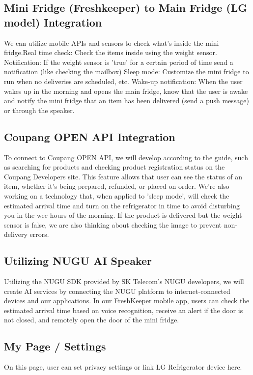\documentclass[conference]{IEEEtran}
\begin{document}
\subsection{Mini Fridge (Freshkeeper) to Main Fridge (LG model) Integration}
We can utilize mobile APIs and sensors to check what's inside the mini fridge.Real time check: Check the items inside using the weight sensor.
Notification: If the weight sensor is 'true' for a certain period of time send a notification (like checking the mailbox)
Sleep mode: Customize the mini fridge to run when no deliveries are scheduled, etc.
Wake-up notification: When the user wakes up in the morning and opens the main fridge, know that the user is awake and notify the mini fridge that an item has been delivered (send a push message) or through the speaker.

\subsection{Coupang OPEN API Integration}
To connect to Coupang OPEN API, we will develop according to the guide, such as searching for products and checking product registration status on the Coupang Developers site. This feature allows that user can see the status of an item, whether it's being prepared, refunded, or placed on order. We're also working on a technology that, when applied to 'sleep mode', will check the estimated arrival time and turn on the refrigerator in time to avoid disturbing you in the wee hours of the morning. If the product is delivered but the weight sensor is false, we are also thinking about checking the image to prevent non-delivery errors. 
\subsection{Utilizing NUGU AI Speaker}
Utilizing the NUGU SDK provided by SK Telecom's NUGU developers, we will create AI services by connecting the NUGU platform to internet-connected devices and our applications. 
In our FreshKeeper mobile app, users can check the estimated arrival time based on voice recognition, receive an alert if the door is not closed, and remotely open the door of the mini fridge. 
\subsection{My Page / Settings}
On this page, user can set privacy settings or link LG Refrigerator device here.
\end{document}
